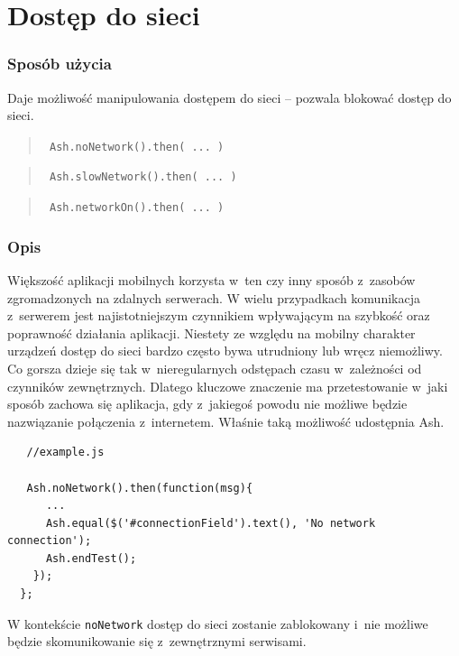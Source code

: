 \documentclass[brudnopis]{xmgr}
\begin{document}
\section{Dostęp do sieci}

\subsubsection{Sposób użycia}

Daje możliwość manipulowania dostępem do sieci -- pozwala blokować dostęp do sieci.

\begin{quote}
  \texttt{  Ash.noNetwork().then( ... )  } 
\end{quote}

\begin{quote}
  \texttt{  Ash.slowNetwork().then( ... )  }
\end{quote}

\begin{quote}
  \texttt{  Ash.networkOn().then( ... )  } 
\end{quote}

\subsubsection{Opis}

Większość aplikacji mobilnych korzysta w~ten czy inny sposób z~zasobów zgromadzonych na zdalnych serwerach. W wielu przypadkach komunikacja z~serwerem jest najistotniejszym czynnikiem wpływającym na szybkość oraz poprawność działania aplikacji. Niestety ze względu na mobilny charakter urządzeń dostęp do sieci bardzo często bywa utrudniony lub wręcz niemożliwy. Co gorsza dzieje się tak w~nieregularnych odstępach czasu w~zależności od czynników zewnętrznych. Dlatego kluczowe znaczenie ma przetestowanie w~jaki sposób zachowa się aplikacja, gdy z~jakiegoś powodu nie możliwe będzie nazwiązanie połączenia z~internetem. Właśnie taką możliwość udostępnia Ash. 

\begin{lstlisting}
   //example.js

   Ash.noNetwork().then(function(msg){
      ...
      Ash.equal($('#connectionField').text(), 'No network connection');
      Ash.endTest();
    });
  };
\end{lstlisting}

W kontekście \texttt{noNetwork} dostęp do sieci zostanie zablokowany i~nie możliwe będzie skomunikowanie się z~zewnętrznymi serwisami.
\end{document}
